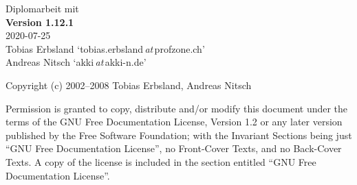 %
%

\begin{titlepage}
	\vspace*{7cm}
	\begin{center}
		\Huge
		Diplomarbeit mit \DMLLaTeX\\
		\vspace{1cm}
		\large
		\textbf{Version 1.12.1}\\
		2020-07-25\\
		\vspace{2cm}
		Tobias Erbsland \enquote*{tobias.erbsland\,\emph{at}\,profzone.ch}\\
		Andreas Nitsch \enquote*{akki\,\emph{at}\,akki-n.de}\\
	\end{center}
	\normalsize
	\vfill
	Copyright (c) 2002--2008 Tobias Erbsland, Andreas Nitsch

Permission is granted to copy, distribute and/or modify this document
under the terms of the GNU Free Documentation License, Version 1.2
or any later version published by the Free Software Foundation;
with the Invariant Sections being just \enquote{GNU Free Documentation License},
no Front-Cover Texts, and no Back-Cover Texts.
A copy of the license is included in the section entitled \enquote{GNU
Free Documentation License}.
	
\end{titlepage}

\tableofcontents

\listoffigures

\listoftables


%
%
